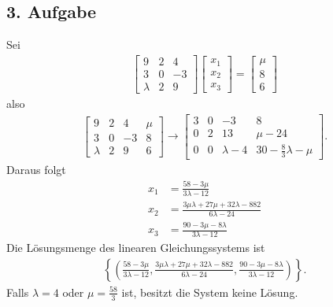 \documentclass[fleqn,draft,a5paper]{article}
\theoremstyle{remark}
\begin{document}
  \subsection{3. Aufgabe}
  Sei
  \begin{align*}
    \begin{bmatrix}
      9 & 2 & 4 \\ 3 & 0 & -3 \\ \lambda & 2 & 9
    \end{bmatrix}
    \begin{bmatrix}
      x_{1} \\ x_{2} \\ x_{3}
    \end{bmatrix}
    =
    \begin{bmatrix}
      \mu \\ 8 \\ 6
    \end{bmatrix}
  \end{align*}
  also
  \begin{gather*}
    \left[
    \begin{array}{ccc|c}
      9 & 2  & 4 & \mu \\
      3 & 0 & -3 & 8 \\
      \lambda & 2 & 9 & 6
    \end{array}
    \right]
    \to
    \left[
    \begin{array}{ccc|c}
      3 & 0 & -3 & 8 \\
      0 & 2 & 13 & \mu - 24 \\
      0 & 0 & \lambda -4 & 30 - \frac83\lambda - \mu
    \end{array}\right].
\end{gather*}
Daraus folgt
\begin{align*}
  x_{1} &= \frac{58-3\mu}{3\lambda-12} \\
  x_{2} &= \frac{3\mu\lambda+27\mu+32\lambda-882}{6\lambda-24} \\
  x_{3} &= \frac{90-3\mu-8\lambda}{3\lambda-12}
\end{align*}
Die Lösungsmenge des linearen Gleichungssystems ist
\begin{align*}
  \left\{\left(\frac{58-3\mu}{3\lambda-12}, \frac{3\mu\lambda+27\mu+32\lambda-882}{6\lambda-24}, \frac{90-3\mu-8\lambda}{3\lambda-12}\right)\right\}.
\end{align*}
Falls \(\lambda = 4\) oder \(\mu=\frac{58}{3}\) ist, besitzt die System keine
Lösung.
\end{document}
